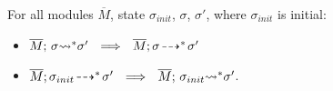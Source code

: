 { \begin{lemma}
\label{lemma:orig:to:bounded:front}
For all modules $\overline M$, state  $\sigma_{init}$,  $\sigma$, $\sigma'$, where
$\sigma_{init}$ is  initial:
\begin{itemize} %
\item 
\label{otbOne}
$\overline{M};\, {\sigma} {\rightsquigarrow^*} \sigma' \ \ \Longrightarrow \  \
\overline{M};\sigma\! \dashrightarrow^*\! {\sigma'}$
\item 
\label{otbTwo}
$\leadstoOrigStar {\Mtwo} {\sigma_{init}}  {\sigma'} %
 \ \  \Longrightarrow\ \
\leadstoBoundedStar  {\Mtwo}  {\sigma_{init}} {\sigma'}$.
\end{itemize}
\end{lemma}
 



}

